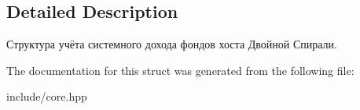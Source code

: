 \subsection{Detailed Description}
Структура учёта системного дохода фондов хоста Двойной Спирали. 

The documentation for this struct was generated from the following file\+:\begin{DoxyCompactItemize}
\item 
include/core.\+hpp\end{DoxyCompactItemize}
